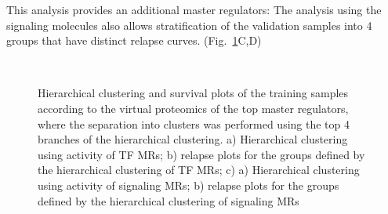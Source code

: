 \documentclass[10pt, letterpaper, twoside, english]{article}
\begin{document}


This analysis provides an additional 
master regulators:
The analysis using the signaling molecules also allows stratification of the validation samples
into 4 groups that have distinct relapse curves.
(Fig.~\ref{fig:clusterPlot}C,D) 

\begin{figure}
\begin{center}
\\
\end{center}
\caption{Hierarchical clustering and survival plots of the training samples 
according to the virtual proteomics of the top master regulators, 
where the separation into clusters was performed using the top 4 branches of the 
hierarchical clustering. 
a) Hierarchical clustering using activity of TF MRs; 
b) relapse plots for the groups defined by the hierarchical clustering of TF MRs;
c) a) Hierarchical clustering using activity of signaling MRs; 
b) relapse plots for the groups defined by the hierarchical clustering of signaling MRs}
\label{fig:clusterPlot}
\end{figure}

\end{document}
